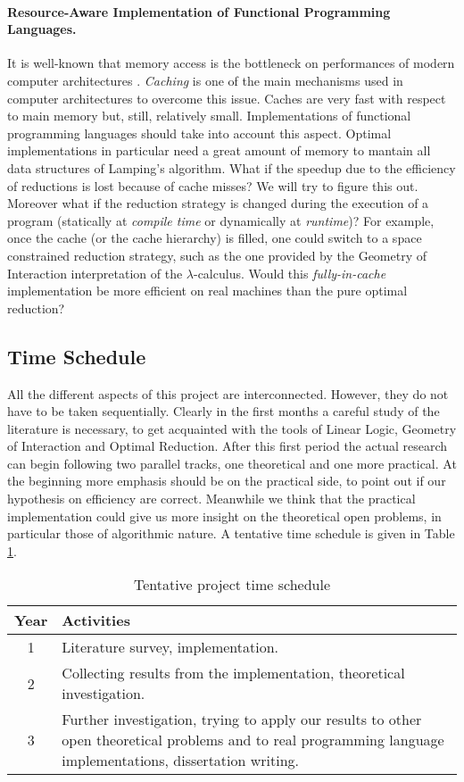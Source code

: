 \documentclass[english]{scrartcl}
\begin{document}
\paragraph{Resource-Aware Implementation of Functional Programming Languages.}It is well-known that memory access is the bottleneck on performances of modern computer architectures \cite{hennessy_computer_2011}. \emph{Caching} is one of the main mechanisms used in computer architectures to overcome this issue. Caches are very fast with respect to main memory but, still, relatively small. Implementations of functional programming languages should take into account this aspect. Optimal implementations in particular need a great amount of memory to mantain all data structures of Lamping's algorithm. What if the speedup due to the efficiency of reductions is lost because of cache misses? We will try to figure this out. Moreover what if the reduction strategy is changed during the execution of a program (statically at \emph{compile time} or dynamically at \emph{runtime})? For example, once the cache (or the cache hierarchy) is filled, one could switch to a space constrained reduction strategy, such as the one provided by the Geometry of Interaction interpretation of the $\lambda$-calculus. Would this \emph{fully-in-cache} implementation be more efficient on real machines than the pure optimal reduction?
\subsection*{Time Schedule}All the different aspects of this project are interconnected. However, they do not have to be taken sequentially. Clearly in the first months a careful study of the literature is necessary, to get acquainted with the tools of Linear Logic, Geometry of Interaction and Optimal Reduction. After this first period the actual research can begin following two parallel tracks, one theoretical and one more practical. At the beginning more emphasis should be on the practical side, to point out if our hypothesis on efficiency are correct. Meanwhile we think that the practical implementation could give us more insight on the theoretical open problems, in particular those of algorithmic nature. A tentative time schedule is given in Table \ref{table:schedule}.
\begin{table}[h]
	\centering
	\begin{tabular}{|c|>{\raggedright}m{10cm}|}
		\hline 
		\textbf{Year} & \textbf{Activities}\tabularnewline
		\hline 
		\hline 
		1 & Literature survey, implementation. \tabularnewline
		\hline 
		2 & Collecting results from the implementation, theoretical investigation. \tabularnewline
		\hline 
		3 & Further investigation, trying to apply our results to other open theoretical problems and to real programming language implementations, dissertation writing. \tabularnewline
		\hline 
	\end{tabular}
	\caption{Tentative project time schedule}
	\label{table:schedule}
\end{table}
\end{document}
